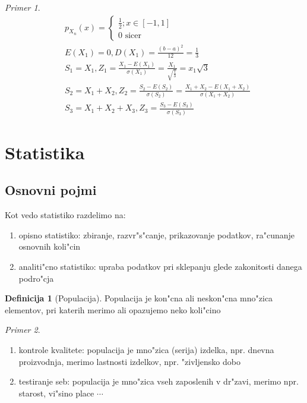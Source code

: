 \documentclass[a4paper,12pt]{article}
\theoremstyle{definition}
\newtheorem{defn}[counter]{Definicija}
\theoremstyle{remark}
\newtheorem*{ex}{Primer}
\begin{document}
\begin{ex}
    \begin{align*}
        &p_{X_n}(x) = \begin{cases}
            \frac{1}{2}; x \in [-1,1] \\
            0 \text{ sicer}
        \end{cases} \\
        &E(X_1) = 0, D(X_1) = \frac{(b-a)^2}{12} = \frac{1}{3} \\
        &S_1 = X_1, Z_1 = \frac{X_1 - E(X_1)}{\sigma(X_1)} = \frac{X_1}{\sqrt{\frac{1}{3}}} = x_1 \sqrt{3} \\
        &S_2 = X_1 + X_2 , Z_2 = \frac{S_2 - E(S_2)}{\sigma(S_2)} =
            \frac{X_1 + X_2 - E(X_1 + X_2)}{\sigma(X_1 + X_2)} \\
        &S_3 = X_1 + X_2 + X_3, Z_3 = \frac{S_3 - E(S_3)}{\sigma(S_3)}
    \end{align*}
\end{ex}

\section{Statistika}

\subsection{Osnovni pojmi}

Kot vedo statistiko razdelimo na:
\begin{enumerate}
    \item opisno statistiko: zbiranje, razvr"s"canje, prikazovanje podatkov, ra"cunanje osnovnih koli"cin
    \item analiti"cno statistiko: upraba podatkov pri sklepanju glede zakonitosti danega podro"cja
\end{enumerate}

\begin{defn}[Populacija]
    Populacija je kon"cna ali neskon"cna mno"zica elementov, pri katerih merimo ali opazujemo neko koli"cino
\end{defn}

\begin{ex} \text{} \\
    \begin{enumerate}[label=(\alph*)]
        \item kontrole kvalitete: populacija je mno"zica (serija) izdelka, npr. dnevna proizvodnja, merimo
            lastnosti izdelkov, npr. "zivljensko dobo
        \item testiranje seb: populacija je mno"zica vseh zaposlenih v dr"zavi, merimo npr. starost,
            vi"sino place $\cdots$
    \end{enumerate}
\end{ex}
\end{document}
